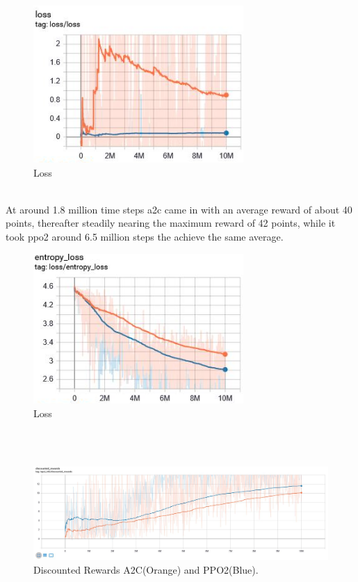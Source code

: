 \documentclass[sigconf]{acmart}
\begin{document}
\begin{figure}[ht]
 \centering
 \includegraphics[width=80mm]{loss.png}
  \caption{Loss}
  \label{fig:loss}
\end{figure}
\\

At around 1.8 million time steps a2c came in with an average reward of about 40 points, thereafter steadily nearing the maximum reward of 42 points, while it took ppo2 around 6.5 million steps the achieve the same average.
\begin{figure}[ht]
 \centering
 \includegraphics[width=80mm]{eloss.png}
  \caption{Loss}
  \label{fig:loss}
\end{figure}
\\
\\
\begin{figure}
 \centering
  \includegraphics[width=\textwidth]{discounted_reward} 
  \caption{Discounted Rewards A2C(Orange) and PPO2(Blue).}
  \label{fig:reward2}
\end{figure}
\end{document}
